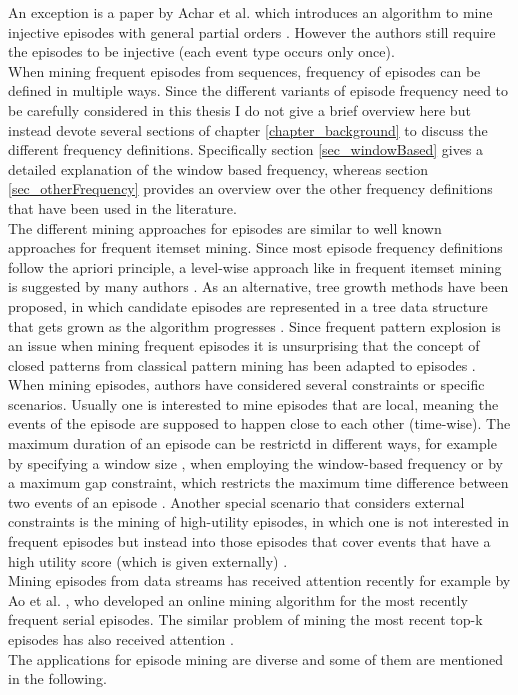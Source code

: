 An exception is a paper by Achar et al. which introduces an algorithm to mine injective episodes with general partial orders \cite{achar2012discovering}. However the authors still require the episodes to be injective (each event type occurs only once). \\
When mining frequent episodes from sequences, frequency of episodes can be defined in multiple ways. Since the different variants of episode frequency need to be carefully considered in this thesis I do not give a brief overview here but instead devote several sections of chapter \ref{chapter_background} to discuss the different frequency definitions. Specifically section \ref{sec_windowBased} gives a detailed explanation of the window based frequency, whereas section \ref{sec_otherFrequency} provides an overview over the other frequency definitions that have been used in the literature. \\
The different mining approaches for episodes are similar to well known approaches for frequent itemset mining. Since most episode frequency definitions follow the apriori principle, a level-wise approach like in frequent itemset mining \cite{agrawal1993mining} is suggested by many authors \cite{mannila1995discovering} \cite{laxman2006discovering}. As an alternative, tree growth methods have been proposed, in which candidate episodes are represented in a tree data structure that gets grown as the algorithm progresses \cite{baumgarten2003tree}. Since frequent pattern explosion is an issue when mining frequent episodes it is unsurprising that the concept of closed patterns from classical pattern mining \cite{wang2003closet+} has been adapted to episodes \cite{zhou2010mining} \cite{tatti2011mining}. \\
When mining episodes, authors have considered several constraints or specific scenarios. Usually one is interested to mine episodes that are local, meaning the events of the episode are supposed to happen close to each other (time-wise). The maximum duration of an episode can be restrictd in different ways, for example by specifying a window size \cite{mannila1995discovering}, when employing the window-based frequency or by a maximum gap constraint, which restricts the maximum time difference between two events of an episode \cite{meger2004constraint}. Another special scenario that considers external constraints is the mining of high-utility episodes, in which one is not interested in frequent episodes but instead into those episodes that cover events that have a high utility score (which is given externally) \cite{wu2013mining}. \\
Mining episodes from data streams has received attention recently for example by Ao et al. \cite{ao2015online}, who developed an online mining algorithm for the most recently frequent serial episodes. The similar problem of mining the most recent top-k episodes has also received attention \cite{patnaik2012efficient}.\\
The applications for episode mining are diverse and some of them are mentioned in the following.

